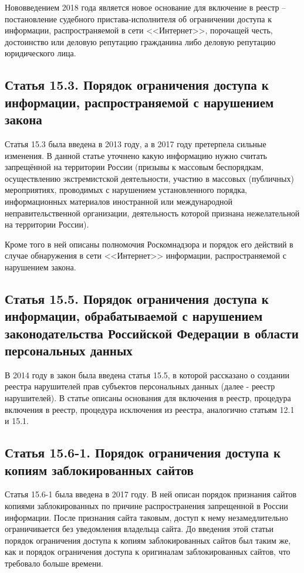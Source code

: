 Нововведением 2018 года является новое основание для включение в реестр -- постановление судебного пристава-исполнителя об ограничении доступа к информации, распространяемой в сети <<Интернет>>, порочащей честь, достоинство или деловую репутацию гражданина либо деловую репутацию юридического лица.

\subsection{Статья 15.3. Порядок ограничения доступа к информации, распространяемой с нарушением закона}

Статья 15.3 была введена в 2013 году, а в 2017 году претерпела сильные изменения. В данной статье уточнено какую информацию нужно считать запрещённой на территории России (призывы к массовым беспорядкам, осуществлению экстремистской деятельности, участию в массовых (публичных) мероприятиях, проводимых с нарушением установленного порядка, информационных материалов иностранной или международной неправительственной организации, деятельность которой признана нежелательной на территории России). 


Кроме того в ней описаны полномочия Роскомнадзора и порядок его действий в случае обнаружения в сети <<Интернет>> информации, распространяемой с нарушением закона.

\subsection{Статья 15.5. Порядок ограничения доступа к информации, обрабатываемой с нарушением законодательства Российской Федерации в области персональных данных}

В 2014 году в закон была введена статья 15.5, в которой рассказано о создании реестра нарушителей прав субъектов персональных данных (далее - реестр нарушителей). В статье описаны основания для включения в реестр, процедура включения в реестр, процедура исключения из реестра, аналогично статьям 12.1 и 15.1. 

\subsection{Статья 15.6-1. Порядок ограничения доступа к копиям заблокированных сайтов}

Статья 15.6-1 была введена в 2017 году. В ней описан порядок признания сайтов копиями заблокированных по причине распространения запрещенной в России информации. После признания сайта таковым, доступ к нему незамедлительно ограничивается без уведомления владельца сайта. До введения этой статьи порядок ограничения доступа к копиям заблокированных сайтов был таким же, как и порядок ограничения доступа к оригиналам заблокированных сайтов, что требовало больше времени.

